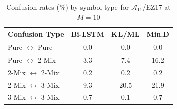 
\begin{table}[h]
\caption{Confusion rates (\%) by symbol type for $\mathcal{A}_{11}$/EZ17 at $M=10$}
\centering
\begin{tabular}{l|ccc}
\toprule
\textbf{Confusion Type} & \textbf{Bi-LSTM} & \textbf{KL/ML} & \textbf{Min.D} \\
\midrule
Pure $\leftrightarrow$ Pure & 0.0 & 0.0 & 0.0 \\
Pure $\leftrightarrow$ 2-Mix & 3.3 & 7.4 & 16.2 \\
2-Mix $\leftrightarrow$ 2-Mix & 0.2 & 0.2 & 0.2 \\
2-Mix $\leftrightarrow$ 3-Mix & 9.3 & 20.5 & 21.9 \\
3-Mix $\leftrightarrow$ 3-Mix & 0.7 & 0.1 & 0.7 \\
\bottomrule
\end{tabular}
\label{Table:ConfusionByType}
\end{table}
